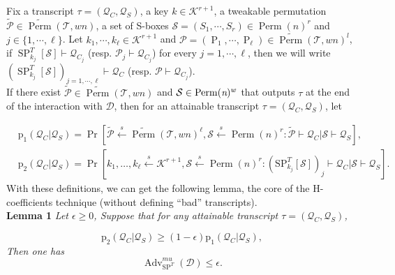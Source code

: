 \medskip{}
%
Fix a transcript $\tau = (\mathcal{Q}_C,\mathcal{Q}_S)$, a key $k \in \mathcal{K}^{r+1}$, a tweakable permutation $\widetilde{\mathcal{P}} \in \widetilde{\operatorname{Perm}}(\mathcal{T}, w n)$,  a set of S-boxes $\mathcal{S}=(S_1, \cdots  ,S_r) \in \operatorname{Perm}(n)^r $ and $j \in \{1, \cdots, \ell \}$. Let $k_1, \cdots ,k_{\ell} \in \mathcal{K}^{r+1}$ and $\mathcal{P} = (\operatorname{P}_1, \cdots ,\operatorname{P}_\ell) \in \widetilde{\operatorname{Perm}}(\mathcal{T},wn)^l$, if $\operatorname{SP}_{k_j}^{T}[\mathcal{S}] \vdash \mathcal{Q}_{C_j}$ (resp. $\mathcal{P}_j \vdash \mathcal{Q}_{C_j}$) for every $j = 1, \cdots ,\ell$, then we will write $(\operatorname{SP} ^{T}_{k_j}[\mathcal{S}])_{j = 1, \cdots ,\ell} \vdash \mathcal{Q}_C$ (resp. $\mathcal{P} \vdash \mathcal{Q}_{C_j}$).\\

If there exist $\widetilde{\mathcal{P}} \in \widetilde{\operatorname{Perm}}(\mathcal{T},w n)$ and $\mathcal{S} \in \operatorname{Perm}(\emph{n})^w$ that outputs $\tau$ at the end of the interaction with $\mathcal{D}$, then for an attainable transcript $\tau = (\mathcal{Q}_C,\mathcal{Q}_S)$, let

$$
\begin{aligned}
&\mathrm{p}_{1}\left(\mathcal{Q}_{C} | \mathcal{Q}_{S}\right)=\operatorname{Pr}\left[\widetilde{\mathcal{P}} \stackrel{s}{\leftarrow} \widetilde{{\operatorname{Perm}}}(\mathcal{T}, w n)^{\ell}, \mathcal{S} \stackrel{s}{\leftarrow} \operatorname{Perm}(n)^{r}: \widetilde{\mathcal{P}} \vdash \mathcal{Q}_{C} | \mathcal{S} \vdash \mathcal{Q}_{S}\right],\\
&\mathrm{p}_{2}\left(\mathcal{Q}_{C} | \mathcal{Q}_{S}\right)=\operatorname{Pr}\left[k_{1}, \ldots, k_{\ell} \stackrel{s}{\leftarrow} \mathcal{K}^{r+1}, \mathcal{S} \stackrel{s}{\leftarrow} \operatorname{Perm}(n)^{r}:\left(\mathrm{SP}_{k_{j}}^{T}[\mathcal{S}]\right)_{j} \vdash \mathcal{Q}_{C} | \mathcal{S} \vdash \mathcal{Q}_{S}\right].
\end{aligned}
$$
With these definitions, we can get the following lemma, the core of the H-coefficients technique (without defining ``bad'' transcripts).\\

\noindent \textbf{Lemma 1} \emph{Let $\epsilon \geq 0$, Suppose that for any attainable transcript $\tau = (\mathcal{Q}_C,\mathcal{Q}_S)$,}

$$
\mathrm{p}_{2}\left(\mathcal{Q}_{C} | \mathcal{Q}_{S}\right) \geq (1 - \epsilon) \mathrm{p}_{1}\left(\mathcal{Q}_{C} | \mathcal{Q}_{S}\right),
$$
\emph{Then one has}
$$
\operatorname{Adv}^{mu}_{\mathrm{SP}^T}(\mathcal{D}) \leq \epsilon.
$$


